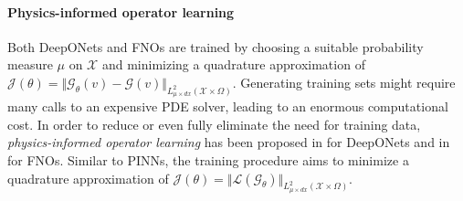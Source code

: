 \documentclass{article}
\numberwithin{equation}{section}
\newcommand{\cG}{\mathcal{G}}
\newcommand{\cJ}{\mathcal{J}}
\newcommand{\cL}{\mathcal{L}}
\newcommand{\cX}{\mathcal{X}}
\newcommand{\1}{\mathbbm{1}}
\begin{document}
\paragraph{Physics-informed operator learning} Both DeepONets and FNOs are trained by choosing a suitable probability measure $\mu$ on $\cX$ and minimizing a quadrature approximation of $\cJ(\theta) = \Vert\cG_\theta(v)-\cG(v)\Vert_{L^2_{\mu \times dx}(\cX\times \Omega)}$. Generating training sets might require many calls to an expensive PDE solver, leading to an enormous computational cost. In order to reduce or even fully eliminate the need for training data, \emph{physics-informed operator learning} has been proposed in \cite{wang2021learning} for DeepONets and in \cite{FNO1} for FNOs. Similar to PINNs, the training procedure aims to minimize a quadrature approximation of $\cJ(\theta) =\Vert\cL(\cG_\theta)\Vert_{L^2_{\mu \times dx}(\cX\times \Omega)}$. 


\end{document}
